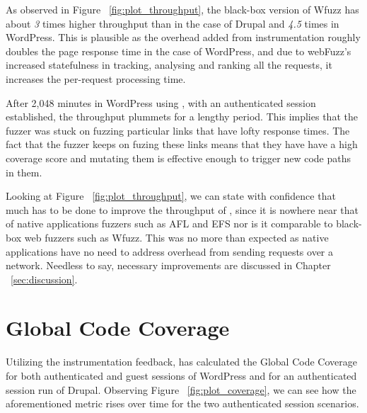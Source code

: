 As observed in Figure ~\ref{fig:plot_throughput}, the black-box version of Wfuzz has about \emph{3} times higher throughput than \pname{} in the case of Drupal and \emph{4.5} times in WordPress. This is plausible as the overhead added from instrumentation roughly doubles the page response time in the case of WordPress, and due to webFuzz's increased statefulness in tracking, analysing and ranking all the requests, it increases the per-request processing time.

After 2,048 minutes in WordPress using \pname{}, with an authenticated session established, the throughput plummets for a lengthy period. This implies that the fuzzer was stuck on fuzzing particular links that have lofty response times. The fact that the fuzzer keeps on fuzing these links means that they have have a high coverage score and mutating them is effective enough to trigger new code paths in them.

Looking at Figure ~\ref{fig:plot_throughput}, we can state with confidence that much has to be done to improve the throughput of \pname{}, since it is nowhere near that of native applications fuzzers such as AFL and EFS nor is it comparable to black-box web fuzzers such as Wfuzz. This was no more than expected as native applications have no need to address overhead from sending requests over a network. Needless to say, necessary improvements are discussed in Chapter ~\ref{sec:discussion}.

\section{Global Code Coverage}
Utilizing the instrumentation feedback, \pname{} has calculated the Global Code Coverage for both authenticated and guest sessions of WordPress and for an authenticated session run of Drupal. Observing Figure ~\ref{fig:plot_coverage}, we can see how the aforementioned metric rises over time for the two authenticated session scenarios.

